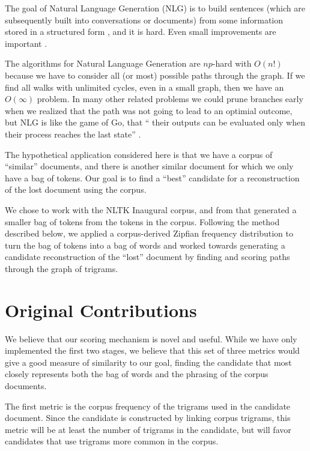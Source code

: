 \documentclass[11pt]{article}
\begin{document}
The goal of Natural Language Generation (NLG) is to build sentences (which are subsequently built into conversations or documents) from some information stored in a structured form \cite{Matulik:18}, and it is hard.  Even small improvements are important \cite{Barros:15}.

The algorithms for Natural Language Generation are $np$-hard with $O(n!)$ because we have to consider all (or most) possible paths through the graph.  If we find all walks with unlimited cycles, even in a small graph, then we have an $O(\infty)$ problem.  In many other related problems we could prune branches early when we realized that the path was not going to lead to an optimial outcome, but NLG is like the game of Go, that `` their outputs can be evaluated
only when their process reaches the last state'' \cite{Kumagai:16}.

The hypothetical application considered here is that we have a corpus of ``similar'' documents, and there is another similar document for which we only have a bag of tokens.  Our goal is to find a ``best'' candidate for a reconstruction of the lost document using the corpus.  

We chose to work with the NLTK Inaugural corpus, and from that generated a smaller bag of tokens from the tokens in the corpus.  Following the method described below, we applied a corpus-derived Zipfian frequency distribution to turn the bag of tokens into a bag of words and worked towards generating a candidate reconstruction of the ``lost'' document by finding and scoring paths through the graph of trigrams.  

\section{Original Contributions}

We believe that our scoring mechanism is novel and useful.  While we have only implemented the first two stages, we believe that this set of three metrics would give a good measure of similarity to our goal, finding the candidate that most closely represents both the bag of words and the phrasing of the corpus documents.  

The first metric is the corpus frequency of the trigrams used in the candidate document.  Since the candidate is constructed by linking corpus trigrams, this metric will be at least the number of trigrams in the candidate, but will favor candidates that use trigrams more common in the corpus.  
\end{document}
